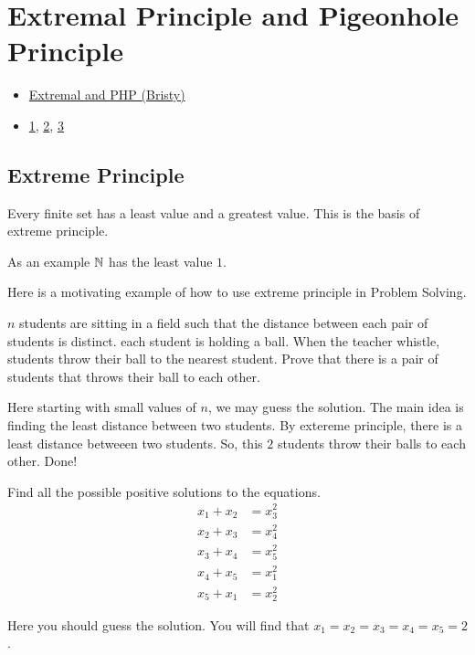 \chapter{Extremal Principle and Pigeonhole Principle}%

\begin{linkb}
   \begin{itemize}
        \item \href{https://www.youtube.com/watch?v=cYTssF84f9g}{Extremal and PHP (Bristy)}
        \item \href{https://drive.google.com/file/d/1sSvTee9gw9lAKwC0n6vyik79VrKpIiv6/view}{1}, \href{https://drive.google.com/file/d/17ps5RJ-FABW7CiSIj87zjC9de9FJyfn-/view}{2}, \href{https://drive.google.com/file/d/1_fbjgE7eFvVpFKNljJS24cN8NbPklCJu/view}{3}
   \end{itemize}
\end{linkb}

\section{Extreme Principle}
Every finite set has a least value and a greatest value. This is the basis of extreme principle.

As an example $\mathbb N$ has the least value $1$.

Here is a motivating example of how to use extreme principle in Problem Solving.

\begin{example}
$n$ students are sitting in a field such 
that the distance between each pair of 
students is distinct. each student is 
holding a ball. When the teacher whistle, 
students throw their ball to the nearest 
student. Prove that there is a pair of 
students that throws their ball to each 
other.
\end{example}
Here starting with small values of $n$, we may guess the solution. The main idea is finding the least distance between two students. By extereme principle, there is a least distance betweeen two students. So, this $2$  students throw their balls to each other. Done!


\begin{example}
Find all the possible positive solutions to the equations.
\begin{align*}
x_1 + x_2 &= x_3 ^2 \\
x_2 + x_3 &= x_4 ^2 \\
x_3 + x_4 &= x_5 ^2 \\
x_4 + x_5 &= x_1 ^2 \\
x_5 + x_1 &= x_2 ^2
\end{align*}
\end{example}
Here you should guess the solution. You will find that $x_1=x_2=x_3=x_4=x_5=2$.

